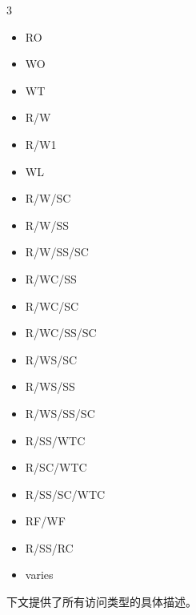\begin{multicols}{3}
  \begin{itemize}
    \item RO
    \item WO
    \item WT
    \item R/W
    \item R/W1
    \item WL
    \item R/W/SC
    \item R/W/SS
    \item R/W/SS/SC
    \item R/WC/SS
    \item R/WC/SC
    \item R/WC/SS/SC
    \item R/WS/SC
    \item R/WS/SS
    \item R/WS/SS/SC
    \item R/SS/WTC
    \item R/SC/WTC
    \item R/SS/SC/WTC
    \item RF/WF
    \item R/SS/RC
    \item varies
  \end{itemize}
\end{multicols}

下文提供了所有访问类型的具体描述。


